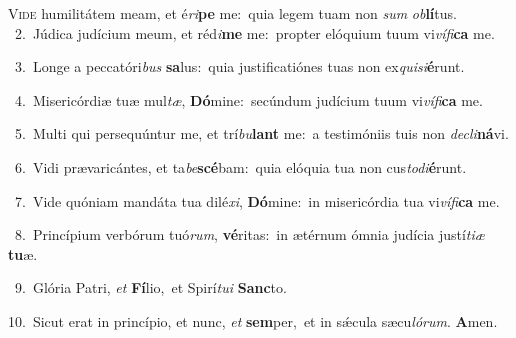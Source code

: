 \lettrine{\initial\textcolor{\initialcolor}{V}}{ide} humilitátem meam, et é\-\textit{ri}\-\textbf{pe} me:~\star quia legem tuam non \textit{sum} \textit{ob}\-\textbf{lí}tus.\\
{\numbfont\textcolor{\numbcolor}{~2.}}~Júdica judícium meum, et réd\-\textit{i}\-\textbf{me} me:~\star propter elóquium tuum vi\-\textit{ví}\-\textit{fi}\textbf{ca} me.\par
{\numbfont\textcolor{\numbcolor}{~3.}}~Longe a peccatóri\textit{bus} \textbf{sa}\-lus:~\star quia justificatiónes tuas non ex\-\textit{qui}\-\textit{si}\textbf{é}runt.\par
{\numbfont\textcolor{\numbcolor}{~4.}}~Misericórdiæ tuæ mul\-\textit{tæ}\-, \textbf{Dó}\-mine:~\star secúndum judícium tuum vi\-\textit{ví}\-\textit{fi}\textbf{ca} me.\par
{\numbfont\textcolor{\numbcolor}{~5.}}~Multi qui persequúntur me, et trí\-\textit{bu}\-\textbf{lant} me:~\star a testimóniis tuis non \textit{de}\-\textit{cli}\textbf{ná}vi.\par
{\numbfont\textcolor{\numbcolor}{~6.}}~Vidi prævaricántes, et ta\-\textit{be}\-\textbf{scé}bam:~\star quia elóquia tua non cus\-\textit{to}\-\textit{di}\textbf{é}runt.\par
{\numbfont\textcolor{\numbcolor}{~7.}}~Vide quóniam mandáta tua dilé\-\textit{xi}\-, \textbf{Dó}\-mine:~\star in misericórdia tua vi\-\textit{ví}\-\textit{fi}\textbf{ca} me.\par
{\numbfont\textcolor{\numbcolor}{~8.}}~Princípium verbórum tuó\-\textit{rum}\-, \textbf{vé}\-ritas:~\star in ætérnum ómnia judícia justí\-\textit{ti}\-\textit{æ} \textbf{tu}\-æ.\par
{\numbfont\textcolor{\numbcolor}{~9.}}~Glória Patri, \textit{et} \textbf{Fí}\-lio,~\star et Spirí\-\textit{tu}\-\textit{i} \textbf{Sanc}\-to.\par
{\numbfont\textcolor{\numbcolor}{10.}}~Sicut erat in princípio, et nunc, \textit{et} \textbf{sem}\-per,~\star et in sǽcula sæcu\-\textit{ló}\-\textit{rum}. \textbf{A}\-men.\par
